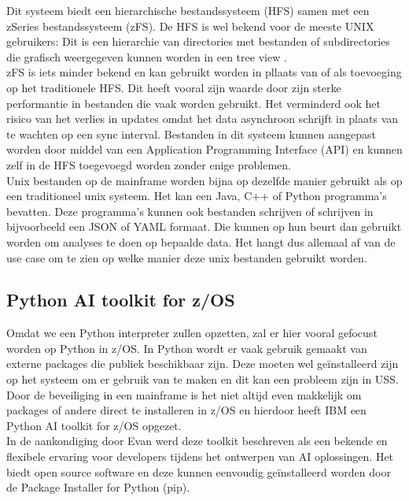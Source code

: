 Dit systeem biedt een hierarchische bestandssysteem (HFS) samen met een zSeries bestandssysteem (zFS). \autocite{Precisely2020} De HFS is wel bekend voor de meeste UNIX gebruikers: Dit is een hierarchie van directories met bestanden of subdirectories die grafisch weergegeven kunnen worden in een tree view \autocite{HCLTechnologies2022}. \\ 
zFS is iets minder bekend en kan gebruikt worden in pllaats van of als toevoeging op het traditionele HFS. Dit heeft vooral zijn waarde door zijn sterke performantie in bestanden die vaak worden gebruikt. Het verminderd ook het risico van het verlies in updates omdat het data asynchroon schrijft in plaats van te wachten op een sync interval. Bestanden in dit systeem kunnen aangepast worden door middel van een Application Programming Interface (API) en kunnen zelf in de HFS toegevoegd worden zonder enige problemen. \autocite{IBM2012} \\

Unix bestanden op de mainframe worden bijna op dezelfde manier gebruikt als op een traditioneel unix systeem. Het kan een Java, C++ of Python programma's bevatten. Deze programma's kunnen ook bestanden schrijven of schrijven in bijvoorbeeld een JSON of YAML formaat. Die kunnen op hun beurt dan gebruikt worden om analyses te doen op bepaalde data. Het hangt dus allemaal af van de use case om te zien op welke manier deze unix bestanden gebruikt worden. \autocite{Precisely2020}

\subsection{Python AI toolkit for z/OS}
Omdat we een Python interpreter zullen opzetten, zal er hier vooral gefocust worden op Python in z/OS. In Python wordt er vaak gebruik gemaakt van externe packages die publiek beschikbaar zijn. Deze moeten wel geïnstalleerd zijn op het systeem om er gebruik van te maken en dit kan een probleem zijn in USS. Door de beveiliging in een mainframe is het niet altijd even makkelijk om packages of andere direct te installeren in z/OS \autocite{IBM2021} en hierdoor heeft IBM een Python AI toolkit for z/OS opgezet. \\

In de aankondiging door Evan \textcite{Rivera2023} werd deze toolkit beschreven als een bekende en flexibele ervaring voor developers tijdens het ontwerpen van AI oplossingen. Het biedt open source software en deze kunnen eenvoudig geïnstalleerd worden door de Package Installer for Python (pip). \\

